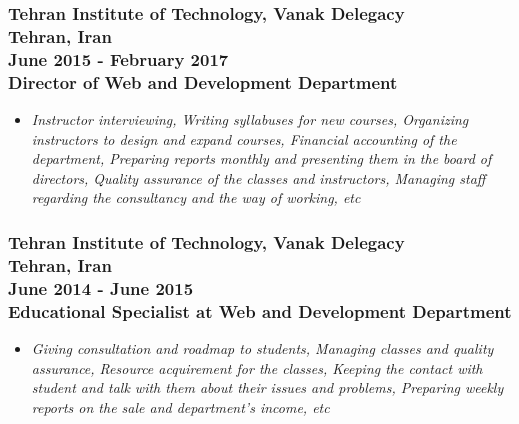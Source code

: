\documentclass[10pt,a4paper]{article}
\begin{document}
\subsubsection{{\large Tehran Institute of Technology, Vanak Delegacy} \\ \textnormal{Tehran, Iran} \\ \textnormal{June 2015 - February 2017} \\ {Director of Web and Development Department}}
  \setlength{\leftskip}{0.5cm}
  \setlength{\rightskip}{1cm}
  \begin{itemize}
    \setlength{\rightskip}{1cm}
    \setlength\itemsep{0em}
    \item \small \textit {Instructor interviewing, Writing syllabuses for new courses, Organizing instructors to design and expand courses, Financial accounting of the department, Preparing reports monthly and presenting them in the board of directors, Quality assurance of the classes and instructors, Managing staff regarding the consultancy and the way of working, etc}
  \end{itemize}
  \setlength{\leftskip}{0pt}
  \setlength{\rightskip}{0cm}
  
\subsubsection{{\large Tehran Institute of Technology, Vanak Delegacy} \\ \textnormal{Tehran, Iran} \\ \textnormal{June 2014 - June 2015} \\ {Educational Specialist at Web and Development Department}}
  \setlength{\leftskip}{0.5cm}
  \setlength{\rightskip}{1cm}
  \begin{itemize}
    \setlength{\rightskip}{1cm}
    \setlength\itemsep{0em}
    \item \small \textit {Giving consultation and roadmap to students, Managing classes and quality assurance, Resource acquirement for the classes, Keeping the contact with student and talk with them about their issues and problems, Preparing weekly reports on the sale and department's income, etc}
  \end{itemize}
  \setlength{\leftskip}{0pt}
  \setlength{\rightskip}{0cm}
  
\end{document}

